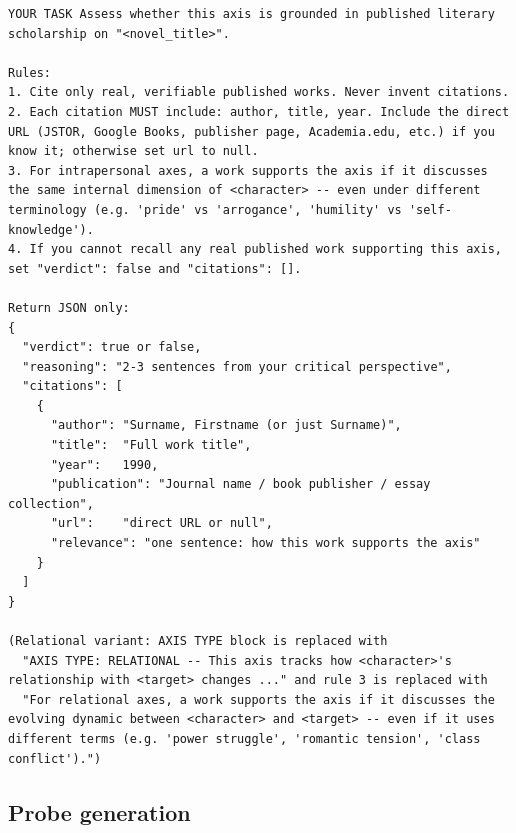\documentclass[11pt]{article}
\begin{document}
\begin{table}[htbp]
\begin{lstlisting}[basicstyle=\ttfamily\scriptsize]
YOUR TASK Assess whether this axis is grounded in published literary scholarship on "<novel_title>".

Rules:
1. Cite only real, verifiable published works. Never invent citations.
2. Each citation MUST include: author, title, year. Include the direct URL (JSTOR, Google Books, publisher page, Academia.edu, etc.) if you know it; otherwise set url to null.
3. For intrapersonal axes, a work supports the axis if it discusses the same internal dimension of <character> -- even under different terminology (e.g. 'pride' vs 'arrogance', 'humility' vs 'self-knowledge').
4. If you cannot recall any real published work supporting this axis, set "verdict": false and "citations": [].

Return JSON only:
{
  "verdict": true or false,
  "reasoning": "2-3 sentences from your critical perspective",
  "citations": [
    {
      "author": "Surname, Firstname (or just Surname)",
      "title":  "Full work title",
      "year":   1990,
      "publication": "Journal name / book publisher / essay collection",
      "url":    "direct URL or null",
      "relevance": "one sentence: how this work supports the axis"
    }
  ]
}

(Relational variant: AXIS TYPE block is replaced with
  "AXIS TYPE: RELATIONAL -- This axis tracks how <character>'s relationship with <target> changes ..." and rule 3 is replaced with
  "For relational axes, a work supports the axis if it discusses the evolving dynamic between <character> and <target> -- even if it uses different terms (e.g. 'power struggle', 'romantic tension', 'class conflict').")
\end{lstlisting}
\end{table}

\clearpage
\subsection{Probe generation}
\end{document}
